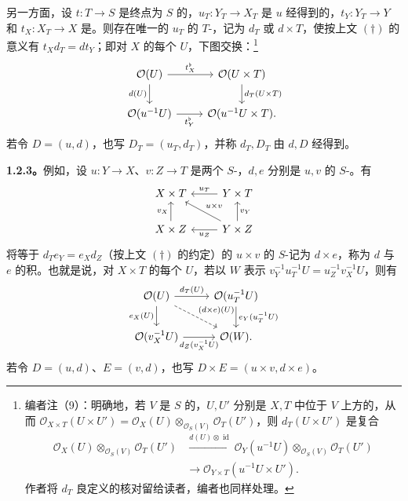 另一方面，设 $t:T\to S$ 是终点为 $S$ 的，$u_T:Y_T\to X_T$ 是 $u$ 经得到的，$t_Y:Y_T\to Y$ 和 $t_X:X_T\to X$ 是。则存在唯一的 $u_T$ 的 $T$-，记为 $d_T$ 或 $d\times T$，使按上文 $(\dagger)$ 的意义有 $t_Xd_T=dt_Y$；即对 $X$ 的每个 $U$，下图交换：\footnote{编者注（9）：明确地，若 $V$ 是 $S$ 的，$U,U'$ 分别是 $X,T$ 中位于 $V$ 上方的，从而 $\mathcal O_{X\times T}(U\times U')=\mathcal O_X(U)\otimes_{\mathcal O_S(V)}\mathcal O_T(U')$，则 $d_T(U\times U')$ 是复合
\[
\begin{aligned}
\mathcal O_X(U)\otimes_{\mathcal O_S(V)}\mathcal O_T(U')&\xrightarrow{d(U)\otimes\operatorname{id}}\mathcal O_Y(u^{-1}U)\otimes_{\mathcal O_S(V)}\mathcal O_T(U')\\
&\longrightarrow\mathcal O_{Y\times T}(u^{-1}U\times U').
\end{aligned}
\]
作者将 $d_T$ 良定义的核对留给读者，编者也同样处理。}
\[
\begin{tikzcd}
\mathcal O(U)\arrow[r,"t_X^\flat"]\arrow[d,"d(U)"']&\mathcal O(U\times T)\arrow[d,"d_T(U\times T)"]\\
\mathcal O(u^{-1}U)\arrow[r,"t_Y^\flat"']&\mathcal O(u^{-1}U\times T).
\end{tikzcd}
\]
若令 $D=(u,d)$，也写 $D_T=(u_T,d_T)$，并称 $d_T,D_T$ 由 $d,D$ 经得到。

\textbf{1.2.3。}例如，设 $u:Y\to X$、$v:Z\to T$ 是两个 $S$-，$d,e$ 分别是 $u,v$ 的 $S$-。有
\[
\begin{tikzcd}
X\times T&Y\times T\arrow[l,"u_T"']\\
X\times Z\arrow[u,"v_X"]&Y\times Z\arrow[l,"u_Z"]\arrow[u,"v_Y"']\arrow[ul,"u\times v"']
\end{tikzcd}
\]
将等于 $d_Te_Y=e_Xd_Z$（按上文 $(\dagger)$ 的约定）的 $u\times v$ 的 $S$-记为 $d\times e$，称为 $d$ 与 $e$ 的积。也就是说，对 $X\times T$ 的每个 $U$，若以 $W$ 表示 $v_Y^{-1}u_T^{-1}U=u_Z^{-1}v_X^{-1}U$，则有
\[
\begin{tikzcd}
\mathcal O(U)\arrow[r,"d_T(U)"]\arrow[d,"e_X(U)"']\arrow[dr,dashed,"(d\times e)(U)"]&\mathcal O(u_T^{-1}U)\arrow[d,"e_Y(u_T^{-1}U)"]\\
\mathcal O(v_X^{-1}U)\arrow[r,"d_Z(v_X^{-1}U)"']&\mathcal O(W).
\end{tikzcd}
\]
若令 $D=(u,d)$、$E=(v,d)$，也写 $D\times E=(u\times v,d\times e)$。

